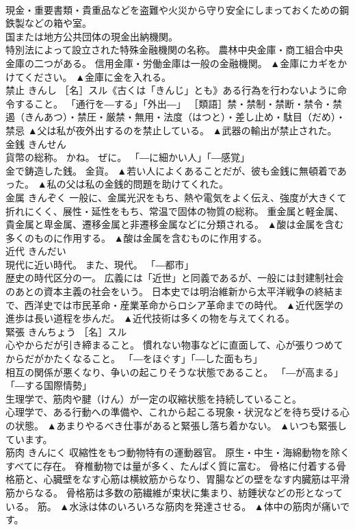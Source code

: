 \documentclass[8pt]{extreport}
\begin{document}
\begin{CJK}{UTF8}{min}
\\	現金・重要書類・貴重品などを盗難や火災から守り安全にしまっておくための鋼鉄製などの箱や室。 
\\	国または地方公共団体の現金出納機関。 
\\	特別法によって設立された特殊金融機関の名称。 農林中央金庫・商工組合中央金庫の二つがある。 信用金庫・労働金庫は一般の金融機関。	▲金庫にカギをかけてください。 ▲金庫に金を入れる。
\\	禁止	きんし	［名］スル《古くは「きんじ」とも》ある行為を行わないように命令すること。 「通行を―する」「外出―」 ［類語］禁・禁制・禁断・禁令・禁遏（きんあつ）・禁圧・厳禁・無用・法度（はつと）・差し止め・駄目（だめ）・禁忌	▲父は私が夜外出するのを禁止している。 ▲武器の輸出が禁止された。
\\	金銭	きんせん	
\\	貨幣の総称。 かね。 ぜに。 「―に細かい人」「―感覚」 
\\	金で鋳造した銭。 金貨。	▲若い人によくあることだが、彼も金銭に無頓着であった。 ▲私の父は私の金銭的問題を助けてくれた。
\\	金属	きんぞく	一般に、金属光沢をもち、熱や電気をよく伝え、強度が大きくて折れにくく、展性・延性をもち、常温で固体の物質の総称。 重金属と軽金属、貴金属と卑金属、遷移金属と非遷移金属などに分類される。	▲酸は金属を含む多くのものに作用する。 ▲酸は金属を含むものに作用する。
\\	近代	きんだい	
\\	現代に近い時代。 また、現代。 「―都市」 
\\	歴史の時代区分の一。 広義には「近世」と同義であるが、一般には封建制社会のあとの資本主義の社会をいう。 日本史では明治維新から太平洋戦争の終結まで、西洋史では市民革命・産業革命からロシア革命までの時代。	▲近代医学の進歩は長い道程を歩んだ。 ▲近代技術は多くの物を与えてくれる。
\\	緊張	きんちょう	［名］スル 
\\	心やからだが引き締まること。 慣れない物事などに直面して、心が張りつめてからだがかたくなること。 「―をほぐす」「―した面もち」 
\\	相互の関係が悪くなり、争いの起こりそうな状態であること。 「―が高まる」「―する国際情勢」 
\\	生理学で、筋肉や腱（けん）が一定の収縮状態を持続していること。 
\\	心理学で、ある行動への準備や、これから起こる現象・状況などを待ち受ける心の状態。	▲あまりやるべき仕事があると緊張し落ち着かない。 ▲いつも緊張しています。
\\	筋肉	きんにく	収縮性をもつ動物特有の運動器官。 原生・中生・海綿動物を除くすべてに存在。 脊椎動物では量が多く、たんぱく質に富む。 骨格に付着する骨格筋と、心臓壁をなす心筋は横紋筋からなり、胃腸などの壁をなす内臓筋は平滑筋からなる。 骨格筋は多数の筋繊維が束状に集まり、紡錘状などの形となっている。 筋。	▲水泳は体のいろいろな筋肉を発達させる。 ▲体中の筋肉が痛いです。

\end{CJK}
\end{document}
